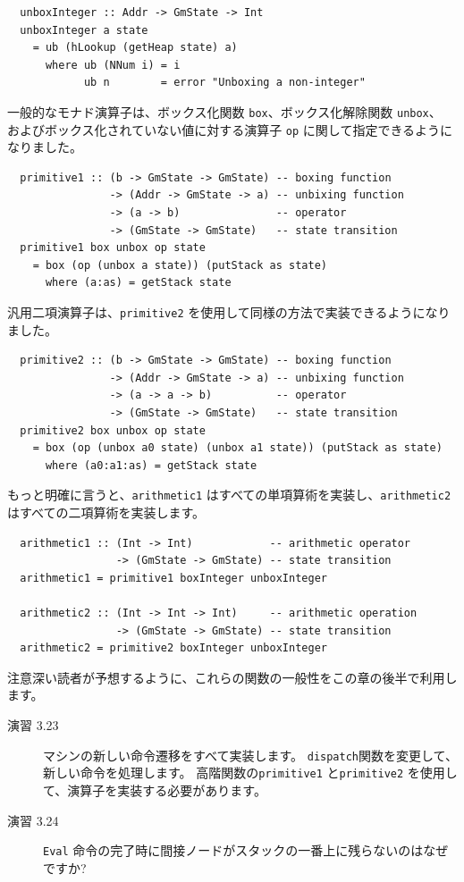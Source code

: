 \documentclass{jbook}
\begin{document}
\begin{verbatim}
  unboxInteger :: Addr -> GmState -> Int
  unboxInteger a state
    = ub (hLookup (getHeap state) a)
      where ub (NNum i) = i
            ub n        = error "Unboxing a non-integer"
\end{verbatim}

一般的なモナド演算子は、ボックス化関数 \texttt{box}、ボックス化解除関数 \texttt{unbox}、
およびボックス化されていない値に対する演算子 \texttt{op} に関して指定できるようになりました。

\begin{verbatim}
  primitive1 :: (b -> GmState -> GmState) -- boxing function
                -> (Addr -> GmState -> a) -- unbixing function
                -> (a -> b)               -- operator
                -> (GmState -> GmState)   -- state transition
  primitive1 box unbox op state
    = box (op (unbox a state)) (putStack as state)
      where (a:as) = getStack state
\end{verbatim}

汎用二項演算子は、\texttt{primitive2} を使用して同様の方法で実装できるようになりました。

\begin{verbatim}
  primitive2 :: (b -> GmState -> GmState) -- boxing function
                -> (Addr -> GmState -> a) -- unbixing function
                -> (a -> a -> b)          -- operator
                -> (GmState -> GmState)   -- state transition
  primitive2 box unbox op state
    = box (op (unbox a0 state) (unbox a1 state)) (putStack as state)
      where (a0:a1:as) = getStack state
\end{verbatim}

もっと明確に言うと、\texttt{arithmetic1} はすべての単項算術を実装し、\texttt{arithmetic2} はすべての二項算術を実装します。

\begin{verbatim}
  arithmetic1 :: (Int -> Int)            -- arithmetic operator
                 -> (GmState -> GmState) -- state transition
  arithmetic1 = primitive1 boxInteger unboxInteger

  arithmetic2 :: (Int -> Int -> Int)     -- arithmetic operation
                 -> (GmState -> GmState) -- state transition
  arithmetic2 = primitive2 boxInteger unboxInteger
\end{verbatim}

注意深い読者が予想するように、これらの関数の一般性をこの章の後半で利用します。

\begin{description}
	\item[演習 3.23] マシンの新しい命令遷移をすべて実装します。
		\texttt{dispatch}関数を変更して、新しい命令を処理します。
		高階関数の\texttt{primitive1} と\texttt{primitive2} を使用して、演算子を実装する必要があります。
	\item[演習 3.24] \texttt{Eval} 命令の完了時に間接ノードがスタックの一番上に残らないのはなぜですか?
\end{description}
\end{document}
